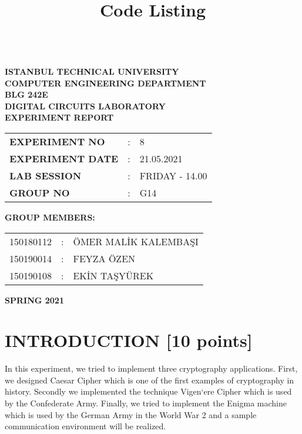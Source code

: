 \documentclass[pdftex,12pt,a4paper]{article}
\title{Code Listing}
\begin{document}
\begin{titlepage}
\begin{center}
\textbf{}\\
\textbf{\Large{ISTANBUL TECHNICAL UNIVERSITY}}\\
\vspace{0.5cm}
\textbf{\Large{COMPUTER ENGINEERING DEPARTMENT}}\\
\vspace{2cm}
\textbf{\Large{BLG 242E\\ DIGITAL CIRCUITS LABORATORY\\ EXPERIMENT REPORT}}\\
\vspace{2.8cm}
\begin{table}[ht]
\centering
\Large{
\begin{tabular}{lcl}
\textbf{EXPERIMENT NO}  & : & 8 \\
\textbf{EXPERIMENT DATE}  & : & 21.05.2021 \\
\textbf{LAB SESSION}  & : & FRIDAY - 14.00 \\
\textbf{GROUP NO}  & : & G14 \\
\end{tabular}}
\end{table}
\vspace{1cm}
\textbf{\Large{GROUP MEMBERS:}}\\
\begin{table}[ht]
\centering
\Large{
\begin{tabular}{rcl}
150180112  & : & ÖMER MALİK KALEMBAŞI \\
150190014  & : & FEYZA ÖZEN \\
150190108  & : & EKİN TAŞYÜREK \\
\end{tabular}}
\end{table}
\vspace{2.8cm}
\textbf{\Large{SPRING 2021}}

\end{center}

\end{titlepage}

\thispagestyle{empty}
\setcounter{tocdepth}{4}
\tableofcontents
\clearpage

\setcounter{page}{1}

\section{INTRODUCTION [10 points]}
In this experiment, we tried to implement three cryptography applications. First, we designed Caesar Cipher which is one of the first examples of cryptography in history. Secondly we implemented the technique  Vigen`ere Cipher which is used by the Confederate Army.
Finally, we tried to implement the Enigma machine which is used by the German Army in the World War 2 and a sample communication environment will be realized. 
\end{document}
